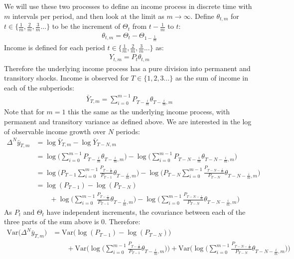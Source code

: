 We will use these two processes to define an income process in discrete time with $m$ intervals per period, and then look at the limit as $m\rightarrow \infty$. Define $\theta_{t,m}$ for $t \in \{\frac{1}{m},\frac{2}{m},\frac{3}{m}...\}$ to be the increment of $\Theta_t$ from $t-\frac{1}{m}$ to $t$:
\begin{align*}
\theta_{t,m} = \Theta_{t}-\Theta_{1-\frac{1}{m}}
\end{align*}
Income is defined for each period $t \in \{\frac{1}{m},\frac{2}{m},\frac{3}{m}...\}$ as:
\begin{align*}
Y_{t,m} = P_t \theta_{t,m}
\end{align*}
Therefore the underlying income process has a pure division into permanent and transitory shocks. Income is observed for $T \in \{1,2,3...\}$ as the sum of income in each of the subperiods:
\begin{align*}
\bar{Y}_{T,m} = \sum_{i=0}^{m-1} P_{T-\frac{i}{m}} \theta_{T-\frac{i}{m},m}
\end{align*}
Note that for $m=1$ this the same as the underlying income process, with permanent and transitory variance as defined above. We are interested in the log of observable income growth over $N$ periods:
\begin{align*}
\Delta^N \bar{y}_{T,m} &= \log{\bar{Y}_{T,m}} - \log{\bar{Y}_{T-N,m}} \\
&= \log\Bigg(\sum_{i=0}^{m-1} P_{T-\frac{i}{m}} \theta_{T-\frac{i}{m},m}\Bigg)
-\log\Bigg(\sum_{i=0}^{m-1} P_{T-N-\frac{i}{m}} \theta_{T-N-\frac{i}{m},m}\Bigg) \\
&= \log\Bigg(P_{T-1}\sum_{i=0}^{m-1} \frac{P_{T-\frac{i}{m}}}{P_{T-1}} \theta_{T-\frac{i}{m},m}\Bigg)
-\log\Bigg(P_{T-N}\sum_{i=0}^{m-1}\frac{ P_{T-N-\frac{i}{m}}}{P_{T-N}} \theta_{T-N-\frac{i}{m},m}\Bigg) \\
&= \log(P_{T-1})-\log(P_{T-N}) \\
& \qquad +\log\Bigg(\sum_{i=0}^{m-1} \frac{P_{T-\frac{i}{m}}}{P_{T-1}} \theta_{T-\frac{i}{m},m}\Bigg)
-\log\Bigg(\sum_{i=0}^{m-1}\frac{ P_{T-N-\frac{i}{m}}}{P_{T-N}} \theta_{T-N-\frac{i}{m},m}\Bigg) 
\end{align*}
As $P_t$ and $\Theta_t$ have independent increments, the covariance between each of the three parts of the sum above is 0. Therefore:
\begin{align*}
\mathrm{Var}\Big(\Delta^N \bar{y}_{T,m}\Big) 
&= \mathrm{Var}\Big(\log(P_{T-1})-\log(P_{T-N}) \Big)\\
& \qquad +\mathrm{Var}\Bigg(\log\Bigg(\sum_{i=0}^{m-1} \frac{P_{T-\frac{i}{m}}}{P_{T-1}} \theta_{T-\frac{i}{m},m}\Bigg)\Bigg)
+\mathrm{Var}\Bigg(\log\Bigg(\sum_{i=0}^{m-1}\frac{ P_{T-N-\frac{i}{m}}}{P_{T-N}} \theta_{T-N-\frac{i}{m},m}\Bigg) \Bigg)
\end{align*}
